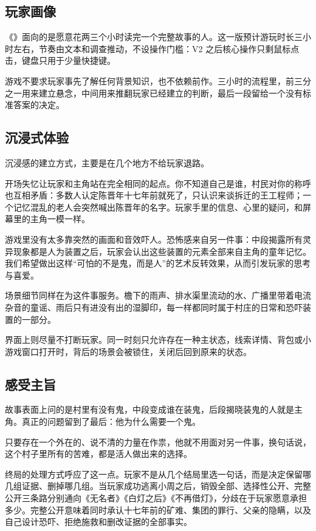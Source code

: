 \subsection{玩家画像}

《\ProjectName》面向的是愿意花两三个小时读完一个完整故事的人。这一版预计游玩时长三小时左右，节奏由文本和调查推动，不设操作门槛：V2 之后核心操作只剩鼠标点击，键盘只用于少量快捷键。

游戏不要求玩家事先了解任何背景知识，也不依赖前作。三小时的流程里，前三分之一用来建立悬念，中间用来推翻玩家已经建立的判断，最后一段留给一个没有标准答案的决定。


\subsection{沉浸式体验}

沉浸感的建立方式，主要是在几个地方不给玩家退路。

开场失忆让玩家和主角站在完全相同的起点。你不知道自己是谁，村民对你的称呼也互相矛盾：多数人认定陈晋年十七年前就死了，只认识来谈拆迁的王工程师；一个记忆混乱的老人会突然喊出陈晋年的名字。玩家手里的信息、心里的疑问，和屏幕里的主角一模一样。

游戏里没有太多靠突然的画面和音效吓人。恐怖感来自另一件事：中段揭露所有灵异现象都是人为装置之后，玩家会认出这些装置的元素全部来自主角的童年记忆。我们希望做出这样“可怕的不是鬼，而是人”的艺术反转效果，从而引发玩家的思考与喜爱。

场景细节同样在为这件事服务。檐下的雨声、排水渠里流动的水、广播里带着电流杂音的童谣、雨后只有进没有出的湿脚印，每一样都同时属于村庄的日常和恐吓装置的一部分。

界面上则尽量不打断玩家。同一时刻只允许存在一种主状态，线索详情、背包或小游戏窗口打开时，背后的场景会被锁住，关闭后回到原来的状态。

\subsection{感受主旨}

故事表面上问的是村里有没有鬼，中段变成谁在装鬼，后段揭晓装鬼的人就是主角。真正的问题留到了最后：他为什么需要一个鬼。

只要存在一个外在的、说不清的力量在作祟，他就不用面对另一件事，换句话说，这个村子里所有的苦难，都是活人做出来的选择。

终局的处理方式呼应了这一点。玩家不是从几个结局里选一句话，而是决定保留哪几组证据、删掉哪几组。当玩家成功逃离小周之后，销毁全部、选择性公开、完整公开三条路分别通向《无名者》《白灯之后》《不再借灯》，分歧在于玩家愿意承担多少。完整公开意味着同时承认十七年前的矿难、集团的罪行、父亲的隐瞒，以及自己设计恐吓、拒绝施救和删改证据的全部事实。

